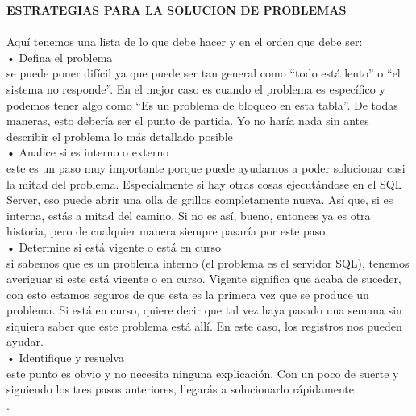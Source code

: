 \documentclass[twoside,twocolumn]{article}
\begin{document}
\begin{flushright}
\begin{itemize}
 \textbf{ESTRATEGIAS PARA LA SOLUCION DE PROBLEMAS }\\ 
 \textbf{}\\ 
Aquí tenemos una lista de lo que debe hacer y en el orden que debe ser:
 \textbf{}\\ 
•	Defina el problema \textbf{}\\ 
 se puede poner difícil ya que puede ser tan general como “todo está lento” o “el sistema no responde”. En el mejor caso es cuando el problema es específico y podemos tener algo como “Es un problema de bloqueo en esta tabla”. De todas maneras, esto debería ser el punto de partida. Yo no haría nada sin antes describir el problema lo más detallado posible\textbf{}\\ 
•	Analice si es interno o externo \textbf{}\\ 
este es un paso muy importante porque puede ayudarnos a poder solucionar casi la mitad del problema. Especialmente si hay otras cosas ejecutándose en el SQL Server, eso puede abrir una olla de grillos completamente nueva. Así que, si es interna, estás a mitad del camino. Si no es así, bueno, entonces ya es otra historia, pero de cualquier manera siempre pasaría por este paso \textbf{}\\ 
•	Determine si está vigente o está en curso \textbf{}\\ 
si sabemos que es un problema interno (el problema es el servidor SQL), tenemos averiguar si este está vigente o en curso. Vigente significa que acaba de suceder, con esto estamos seguros de que esta es la primera vez que se produce un problema. Si está en curso, quiere decir que tal vez haya pasado una semana sin siquiera saber que este problema está allí. En este caso, los registros nos pueden ayudar. \textbf{}\\ 
•         Identifique y resuelva \textbf{}\\ 
este punto es obvio y no necesita ninguna explicación. Con un poco de suerte y siguiendo los tres pasos anteriores, llegarás a solucionarlo rápidamente \textbf{}\\ .


\textbf{}\\
\textbf{}\\

\begin{thebibliography}{99} %




\end{thebibliography}
\end{itemize}
\end{flushright}
\end{document}
